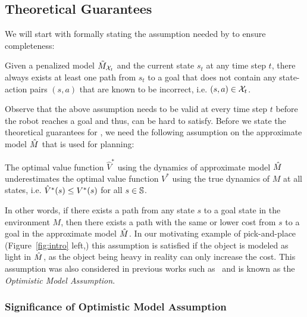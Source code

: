 \subsection{Theoretical Guarantees}
\label{sec:guarantees}

We will start with formally stating the assumption needed by
\cmax{} to ensure completeness:
\begin{assumption}
	Given a penalized model $\tilde{M}_{\mathcal{X}_t}$ and the
        current state $s_t$ at any time step $t$, there always exists
        at least one path from $s_t$ to a goal that does not contain
        any state-action pairs $(s, a)$ that are known to be
        incorrect, i.e. $(s, a) \in \mathcal{X}_t$.  
        \label{assumption:cmax}      
\end{assumption}
Observe that the above assumption needs to be valid at every time step
$t$ before the robot reaches a goal and thus, can be hard to satisfy.
Before we state the theoretical guarantees for \cmaxpp{}, we
need the following assumption on the approximate model $\hat{M}$ that is
used for planning:
\begin{assumption}
	The optimal value function $\hat{V}^*$ using the dynamics of
        approximate model $\hat{M}$ underestimates the optimal value
        function $V^*$ using the true dynamics of $M$ at all states,
        i.e. $\hat{V}^*(s) \leq V^*(s)$ for all $s \in
        \mathbb{S}$.    
	\label{assumption:cmaxpp}
\end{assumption}
In other words, if there exists a path from any state $s$ to a goal
state in the environment $M$, then there exists a path with the same
or lower cost from $s$ to a goal in the approximate model $\hat{M}$. In
our motivating example of pick-and-place (Figure~\ref{fig:intro}
left,) this assumption is satisfied if the object is modeled as light
in $\hat{M}$, as the object being heavy in reality can only increase the cost. 
This assumption was also considered in previous
works such as~\cite{DBLP:conf/aaai/Jiang18} and is known as the
\textit{Optimistic Model Assumption}.

\subsubsection{Significance of Optimistic Model Assumption}
\label{sec:sign-optim-model}

